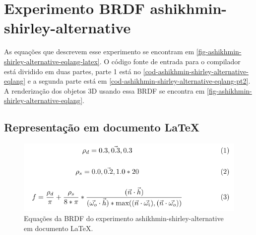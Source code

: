 \section{Experimento BRDF ashikhmin-shirley-alternative}

As equações que descrevem esse experimento se encontram em \autoref{fig-ashikhmin-shirley-alternative-eqlang-latex}. O código fonte de entrada para o compilador está dividido em duas partes, parte 1 está no \autoref{cod-ashikhmin-shirley-alternative-eqlang} e a segunda parte está em \autoref{cod-ashikhmin-shirley-alternative-eqlang-pt2}. A renderização dos objetos 3D usando essa BRDF se encontra em \autoref{fig-ashikhmin-shirley-alternative-eqlang}.

\subsection{Representação em documento \LaTeX{}}
\begin{figure}[H]
    \caption{\label{fig-ashikhmin-shirley-alternative-eqlang-latex} \small Equações da BRDF do experimento ashikhmin-shirley-alternative em documento \LaTeX{}.}
    \begin{center}
        \includegraphics[scale=0.92]{./Imagens/brdfs/ashikhmin-shirley-alternative.pdf}
    \end{center}
\end{figure}

